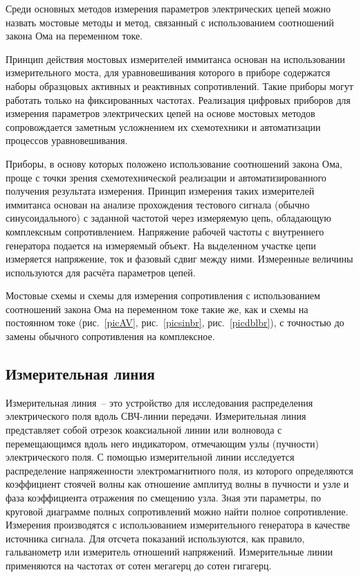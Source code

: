 \documentclass[pscyr]{hedwork}
\newcommand{\Pic}[1]{\ref{pic#1}}
\newcommand{\pic}[1]{рис.~\Pic{#1}}
\begin{document}
  Среди основных методов измерения параметров электрических цепей можно назвать
  мостовые методы и метод, связанный с использованием соотношений закона Ома на
  переменном токе.
  
  Принцип действия мостовых измерителей иммитанса основан на использовании
  измерительного моста, для уравновешивания которого в приборе содержатся наборы
  образцовых активных и реактивных сопротивлений. Такие приборы могут работать
  только на фиксированных частотах. Реализация цифровых приборов для измерения
  параметров электрических цепей на основе мостовых методов сопровождается
  заметным усложнением их схемотехники и автоматизации процессов уравновешивания.
  
  Приборы, в основу которых положено использование соотношений закона Ома,
  проще с точки зрения схемотехнической реализации и автоматизированного
  получения результата измерения. Принцип измерения таких измерителей иммитанса
  основан на анализе прохождения тестового сигнала (обычно синусоидального) с
  заданной частотой через измеряемую цепь, обладающую комплексным
  сопротивлением. Напряжение рабочей частоты с внутреннего генератора подается
  на измеряемый объект. На выделенном участке цепи измеряется напряжение, ток и
  фазовый сдвиг между ними. Измеренные величины используются для расчёта
  параметров цепей.
  
  Мостовые схемы и схемы для измерения сопротивления с использованием
  соотношений закона Ома на переменном токе такие же, как и схемы на постоянном
  токе (\pic{AV}, \pic{sinbr}, \pic{dblbr}), с точностью до замены обычного
  сопротивления на комплексное.
  
  \subsection{Измерительная линия}

  Измерительная линия~-- это устройство для исследования распределения
  электрического поля вдоль СВЧ-линии передачи. Измерительная линия представляет
  собой отрезок коаксиальной линии или волновода с перемещающимся вдоль него
  индикатором, отмечающим узлы (пучности) электрического поля. С помощью
  измерительной линии исследуется распределение напряженности электромагнитного
  поля, из которого определяются коэффициент стоячей волны как отношение
  амплитуд волны в пучности и узле и фаза коэффициента отражения по смещению
  узла. Зная эти параметры, по круговой диаграмме полных сопротивлений можно
  найти полное сопротивление. Измерения производятся с использованием
  измерительного генератора в качестве источника сигнала. Для отсчета показаний
  используются, как правило, гальванометр или измеритель отношений напряжений.
  Измерительные линии применяются на частотах от сотен мегагерц до сотен
  гигагерц.
\end{document}
